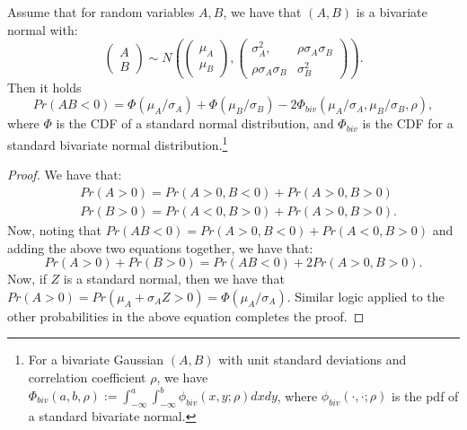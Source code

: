 \begin{lemma} \label{lem:bivariate_product}
Assume that for random variables $A, B$, we have that $(A,B)$ is a bivariate normal with:
\begin{equation}
\begin{pmatrix} A \\ B \end{pmatrix} \sim
N \left( 
		\begin{pmatrix} \mu_A \\ \mu_B \end{pmatrix},
		\begin{pmatrix} \sigma_A^2, & \rho \sigma_A \sigma_B \\ \rho \sigma_A \sigma_B & \sigma_B^2 \end{pmatrix}
\right).
\end{equation}
Then it holds
\begin{equation}
	Pr(AB < 0) = \Phi(\mu_A / \sigma_A) + \Phi(\mu_B / \sigma_B) - 2 \Phi_{biv}(\mu_A / \sigma_A, \mu_B / \sigma_B, \rho),
\end{equation}
where $\Phi$ is the CDF of a standard normal distribution, and $\Phi_{biv}$ is the CDF for a standard bivariate normal distribution.\footnote{For a bivariate Gaussian $(A,B)$ with unit standard deviations and correlation coefficient $\rho$, we have $\Phi_{biv}(a,b,\rho) := \int_{-\infty}^a \int_{-\infty}^b \phi_{biv}(x, y; \rho) dx dy$, where $\phi_{biv}(\cdot, \cdot;\rho)$ is the pdf of a standard bivariate normal.}
\end{lemma}
\begin{proof}
	We have that:
	\begin{align*}
		& Pr(A > 0) = Pr(A > 0, B < 0) + Pr(A > 0, B > 0) \\
		& Pr(B > 0) = Pr(A < 0, B > 0) + Pr(A > 0, B > 0).
	\end{align*}
	Now, noting that $Pr(AB < 0) = Pr(A > 0, B < 0) + Pr(A < 0, B > 0)$ and adding the above two equations together, we have that:
	\begin{equation*}
		Pr(A > 0) + Pr(B > 0) = Pr(AB < 0) + 2Pr(A > 0, B > 0).
	\end{equation*}
	Now, if $Z$ is a standard normal, then we have that $Pr(A > 0) = Pr(\mu_A + \sigma_A Z > 0) = \Phi(\mu_A / \sigma_A)$. Similar logic applied to the other probabilities in the above equation completes the proof.
\end{proof}

